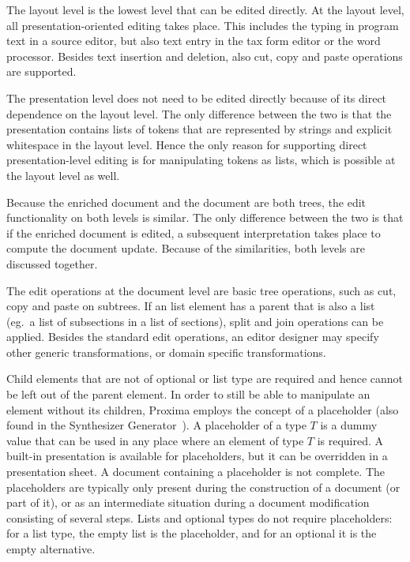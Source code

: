 
The layout level is the lowest level that can be edited directly. At the layout level, all presentation-oriented editing takes place. This includes the typing in program text in a source editor, but also text entry in the tax form editor or the word processor. Besides text insertion and deletion, also cut, copy and paste operations are supported.


The presentation level does not need to be edited directly because of its direct dependence on the layout level. The only difference between the two is that the presentation contains lists of tokens that are represented by strings and explicit whitespace in the layout level. Hence the only reason for supporting direct presentation-level editing is for manipulating tokens as lists, which is possible at the layout level as well.


Because the enriched document and the document are both trees, the edit functionality on both levels is similar. The only difference between the two is that if the enriched document is edited, a subsequent interpretation takes place to compute the document update. Because of the similarities, both levels are discussed together.

The edit operations at the document level are basic tree operations, such as cut, copy and paste on subtrees. If an list element has a parent that is also a list (eg.\ a list of subsections in a list of sections), split and join operations can be applied. Besides the standard edit operations, an editor designer may specify other generic transformations, or domain specific transformations.

Child elements that are not of optional or list type are required and hence cannot be left out of the parent element. In order to still be able to manipulate an element without its children, Proxima employs the concept of a placeholder (also found in the Synthesizer Generator~\cite{reps84synGen}). A placeholder of a type $T$ is a dummy value that can be used in any place where an element of type $T$ is required. A built-in presentation is available for placeholders, but it can be overridden in a presentation sheet. A document containing a placeholder is not complete. The placeholders are typically only present during the construction of a document (or part of it), or as an intermediate situation during a document modification consisting of several steps. Lists and optional types do not require placeholders: for a list type, the empty list is the placeholder, and for an optional it is the empty alternative.

